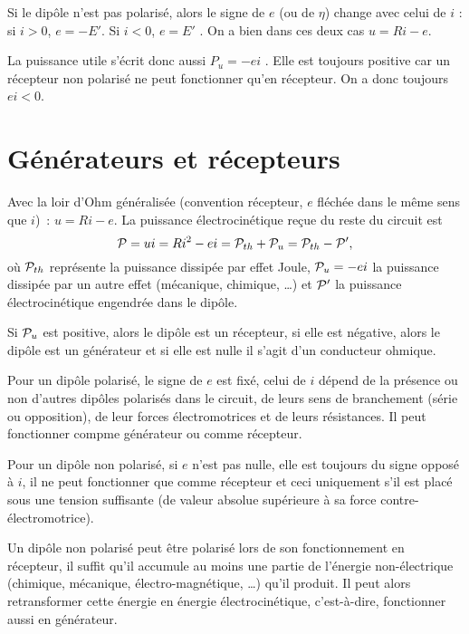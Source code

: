Si le dipôle n'est pas polarisé, alors le signe de $e$ (ou de $\eta$) change avec celui de $i$ : si $i > 0$, $e = -E'$. Si $i < 0$, $e = E'$ . On a bien dans ces deux cas $u = R i - e$.

La puissance utile s'écrit donc aussi $P_u = - e i$ . Elle est toujours positive car un récepteur non polarisé ne peut fonctionner qu'en récepteur. On a donc toujours $ei < 0$.

\section{Générateurs et récepteurs}
Avec la loir d'Ohm généralisée (convention récepteur, $e$ fléchée dans le même sens que $i$)~: $u=Ri-e$. La puissance électrocinétique reçue du reste du circuit est 
\begin{equation}
	\P = ui = Ri^2 - ei = \P_{th}+ \P_u = \P_{th} - \P', 
\end{equation}
où $\P_{th}$ représente la puissance dissipée par effet Joule, $\P_u=-ei$ la puissance dissipée par un autre effet (mécanique, chimique, \ldots{}) et $\P'$ la puissance électrocinétique engendrée dans le dipôle.

Si $\P_u$ est positive, alors le dipôle est un récepteur, si elle est négative, alors le dipôle est un générateur et si elle est nulle il s'agit d'un conducteur ohmique.

Pour un dipôle polarisé, le signe de $e$ est fixé, celui de $i$ dépend de la présence ou non d'autres dipôles polarisés dans le circuit, de leurs sens de branchement (série ou opposition), de leur forces électromotrices et de leurs résistances. Il peut fonctionner compme générateur ou comme récepteur.

Pour un dipôle non polarisé, si $e$ n'est pas nulle, elle est toujours du signe opposé à $i$, il ne peut fonctionner que comme récepteur et ceci uniquement s'il est placé sous une tension suffisante (de valeur absolue supérieure à sa force contre-électromotrice).

Un dipôle non polarisé peut être polarisé lors de son fonctionnement en récepteur, il suffit qu'il accumule au moins une partie de l'énergie non-électrique (chimique, mécanique, électro-magnétique, \ldots) qu'il produit. Il peut alors retransformer cette énergie en énergie électrocinétique, c'est-à-dire, fonctionner aussi en générateur.


